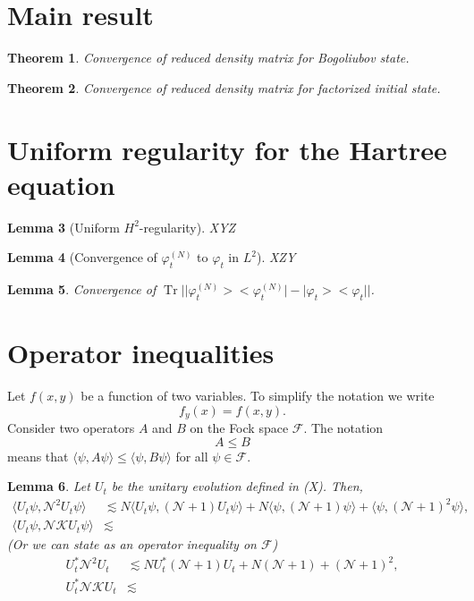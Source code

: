 \documentclass[11pt,a4paper]{scrartcl} %
\newtheorem{thm}{Theorem}[section]
\newtheorem{lem}[thm]{Lemma}
\newcommand{\N}{\mathcal{N}}
\newcommand{\K}{\mathcal{K}}
\newcommand{\ph}{\varphi_t^{(N)}}	%
\newcommand{\project}[1]{\lvert #1 \big>\big< #1\rvert}	%
\newcommand{\Tr}{\operatorname{Tr}}	%
\begin{document}
\section{Main result}
\begin{thm}
 Convergence of reduced density matrix for Bogoliubov state.
\end{thm}

\begin{thm}
 Convergence of reduced density matrix for factorized initial state.
\end{thm}


\section{Uniform regularity for the Hartree equation}
\begin{lem}[Uniform $H^2$-regularity]
 XYZ
\end{lem}
\begin{lem}[Convergence of $\ph$ to $\varphi_t$ in $L^2$]
 XZY
\end{lem}

\begin{lem}
 Convergence of $\Tr \lvert \project{\ph} - \project{\varphi_t} \rvert$.
\end{lem}


\section{Operator inequalities}


Let $f(x,y)$ be a function of two variables. To simplify the notation we write
\[
  f_y(x) = f(x,y).
\]
Consider two operators $A$ and $B$ on the Fock space $\mathcal{F}$. The
notation
\[
  A \le B
\]
means that $\langle \psi, A \psi \rangle \le \langle \psi, B \psi \rangle$ for
all $\psi \in \mathcal{F}$.


\begin{lem}
  \label{l:N2}
  Let $U_t$ be the unitary evolution defined in (X). Then,
  \begin{align}
    \langle U_t \psi, \N^2 U_t \psi \rangle & \apprle N \langle U_t \psi,
    (\N+1) U_t \psi \rangle + N \langle \psi, (\N+1) \psi \rangle + \langle
    \psi, (\N+1)^2 \psi \rangle, \tag{i} \\
    \langle U_t \psi, \N \K U_t \psi \rangle & \apprle \tag{ii}
  \end{align}
  (Or we can state as an operator inequality on $\mathcal{F}$)
  \begin{align}
    U_t^* \N^2 U_t & \apprle N U_t^* (\N+1) U_t + N (\N+1) + (\N+1)^2, \tag{i}
    \\
    U_t^* \N \K U_t & \apprle \tag{ii}
  \end{align}
\end{lem}
\end{document}
